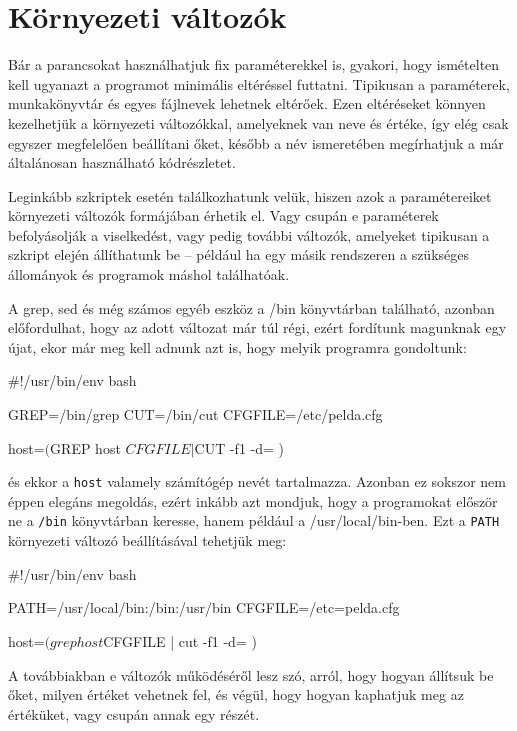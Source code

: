 \chapter{Környezeti változók}%
\label{cha:env-vars}

Bár a parancsokat használhatjuk fix paraméterekkel is, gyakori, hogy ismételten
kell ugyanazt a programot minimális eltéréssel futtatni. Tipikusan a
paraméterek, munkakönyvtár és egyes fájlnevek lehetnek eltérőek. Ezen
eltéréseket könnyen kezelhetjük a környezeti változókkal, amelyeknek van neve és
értéke, így elég csak egyszer megfelelően beállítani őket, később a név
ismeretében megírhatjuk a már általánosan használható kódrészletet.

Leginkább szkriptek esetén találkozhatunk velük, hiszen azok a paramétereiket
környezeti változók formájában érhetik el. Vagy csupán e paraméterek
befolyásolják a viselkedést, vagy pedig további változók, amelyeket tipikusan a
szkript elején állíthatunk be -- például ha egy másik rendszeren a szükséges
állományok és programok máshol találhatóak.

A grep, sed és még számos egyéb eszköz a /bin könyvtárban található, azonban
előfordulhat, hogy az adott változat már túl régi, ezért fordítunk magunknak egy
újat, ekor már meg kell adnunk azt is, hogy melyik programra gondoltunk:

\begin{VerbExample}
#!/usr/bin/env bash

GREP=/bin/grep
CUT=/bin/cut
CFGFILE=/etc/pelda.cfg

host=$($GREP host $CFGFILE | $CUT -f1 -d= )
\end{VerbExample}

\indent és ekkor a \texttt{host} valamely számítógép nevét tartalmazza. Azonban
ez sokszor nem éppen elegáns megoldás, ezért inkább azt mondjuk, hogy a
programokat először ne a \texttt{/bin} könyvtárban keresse, hanem például a
/usr/local/bin-ben. Ezt a \texttt{PATH} környezeti változó beállításával
tehetjük meg:

\begin{VerbExample}
 #!/usr/bin/env bash

PATH=/usr/local/bin:/bin:/usr/bin
CFGFILE=/etc=pelda.cfg

host=$(grep host $CFGFILE | cut -f1 -d= )
\end{VerbExample}

A továbbiakban e változók működéséről lesz szó, arról, hogy hogyan állítsuk be
őket, milyen értéket vehetnek fel, és végül, hogy hogyan kaphatjuk meg az
értéküket, vagy csupán annak egy részét.

